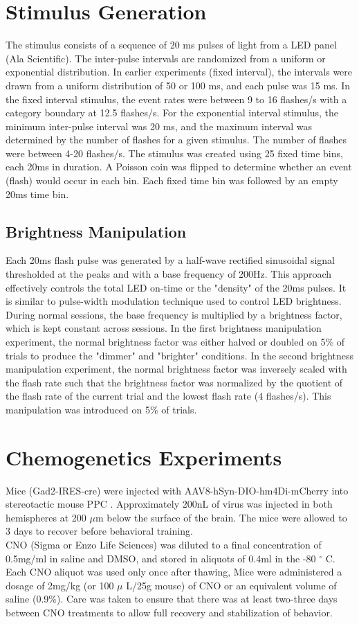 \section{Stimulus Generation}
The stimulus consists of a sequence of 20 ms pulses of light from a LED panel (Ala Scientific). The inter-pulse intervals are randomized from a uniform or exponential distribution. In earlier experiments (fixed interval), the intervals were drawn from a uniform distribution of 50 or 100 ms, and each pulse was 15 ms. In the fixed interval stimulus, the event rates were between 9 to 16 flashes/s with a category boundary at 12.5 flashes/s. For the exponential interval stimulus, the minimum inter-pulse interval was 20 ms, and the maximum interval was determined by the number of flashes for a given stimulus. The number of flashes were between 4-20 flashes/s. The stimulus was created using 25 fixed time bins, each 20ms in duration. A Poisson coin was flipped to determine whether an event (flash) would occur in each bin. Each fixed time bin was followed by an empty 20ms time bin. 
\subsection{Brightness Manipulation}
Each 20ms flash pulse was generated by a half-wave rectified sinusoidal signal thresholded at the peaks and with a base frequency of 200Hz. This approach effectively controls the total LED on-time or the "density" of the 20ms pulses. It is similar to pulse-width modulation technique used to control LED brightness. During normal sessions, the base frequency is multiplied by a brightness factor, which is kept constant across sessions. In the first brightness manipulation experiment, the normal brightness factor was either halved or doubled on 5\% of trials to produce the "dimmer" and "brighter" conditions. In the second brightness manipulation experiment, the normal brightness factor was inversely scaled with the flash rate such that the brightness factor was normalized by the quotient of the flash rate of the current trial and the lowest flash rate (4 flashes/s). This manipulation was introduced on 5\% of trials.  

\section{Chemogenetics Experiments}
Mice (Gad2-IRES-cre) were injected with AAV8-hSyn-DIO-hm4Di-mCherry into stereotactic mouse PPC \parencite{Harvey2012}. Approximately 200nL of virus was injected in both hemispheres at 200 $\mu$m below the surface of the brain.  The mice were allowed to 3 days to recover before behavioral training. \\
CNO (Sigma or Enzo Life Sciences) was diluted to a final concentration of 0.5mg/ml in saline and DMSO, and stored in aliquots of 0.4ml in the -80 $^\circ$ C. Each CNO aliquot was used only once after thawing, Mice were administered a dosage of 2mg/kg (or 100 $\mu$ L/25g mouse) of CNO or an equivalent volume of saline (0.9\%). Care was taken to ensure that there was at least two-three days between CNO treatments to allow full recovery and stabilization of behavior. 

